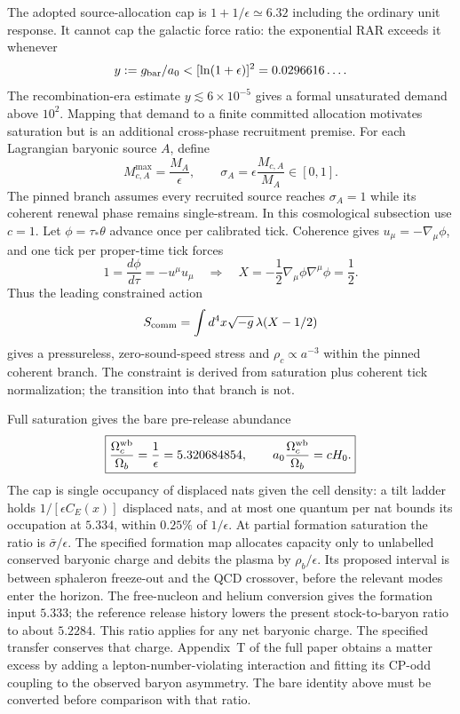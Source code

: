 \documentclass[11pt]{article}
\begin{document}
The adopted source-allocation cap is $1+1/\epsilon\simeq6.32$ including the ordinary unit response. It cannot cap the galactic force ratio: the exponential RAR exceeds it whenever
\[
y:=g_{\rm bar}/a_0<[\ln(1+\epsilon)]^2=0.0296616\ldots.
\]
The recombination-era estimate $y\lesssim6\times10^{-5}$ gives a formal unsaturated demand above $10^2$. Mapping that demand to a finite committed allocation motivates saturation but is an additional cross-phase recruitment premise. For each Lagrangian baryonic source $A$, define
\[
M_{c,A}^{\max}=\frac{M_A}{\epsilon},
\qquad
\sigma_A=\epsilon\frac{M_{c,A}}{M_A}\in[0,1].
\]
The pinned branch assumes every recruited source reaches $\sigma_A=1$ while its coherent renewal phase remains single-stream. In this cosmological subsection use $c=1$. Let $\phi=\tau_*\theta$ advance once per calibrated tick. Coherence gives $u_\mu=-\nabla_\mu\phi$, and one tick per proper-time tick forces
\[
1=\frac{d\phi}{d\tau}=-u^\mu u_\mu
\quad\Rightarrow\quad
\boxed{X=-\frac12\nabla_\mu\phi\nabla^\mu\phi=\frac12}.
\]
Thus the leading constrained action
\[
S_{\rm comm}=\int d^4x\sqrt{-g}\,\lambda(X-1/2)
\]
gives a pressureless, zero-sound-speed stress and $\rho_c\propto a^{-3}$ within the pinned coherent branch. The constraint is derived from saturation plus coherent tick normalization; the transition into that branch is not.

Full saturation gives the bare pre-release abundance
\[
\boxed{\frac{\Omega_c^{\rm wb}}{\Omega_b}
=\frac1\epsilon=5.320684854,\qquad
a_0\frac{\Omega_c^{\rm wb}}{\Omega_b}=cH_0.}
\]
The cap is single occupancy of displaced nats given the cell density: a tilt ladder holds $1/[\epsilon C_E(x)]$ displaced nats, and at most one quantum per nat bounds its occupation at $5.334$, within $0.25\%$ of $1/\epsilon$.
At partial formation saturation the ratio is $\bar\sigma/\epsilon$.
The specified formation map allocates capacity only to unlabelled conserved
baryonic charge and debits the plasma by $\rho_b/\epsilon$.
Its proposed interval is between sphaleron freeze-out and the QCD
crossover, before the relevant modes enter the horizon. The free-nucleon
and helium conversion gives the formation input $5.333$; the reference release history lowers
the present stock-to-baryon ratio to about $5.2284$. This ratio applies
for any net baryonic charge. The specified transfer conserves that charge.
Appendix~T of the full paper obtains a matter excess by adding a
lepton-number-violating interaction and fitting its CP-odd coupling to
the observed baryon asymmetry.
The bare identity above must be converted before comparison with that ratio.
\end{document}
